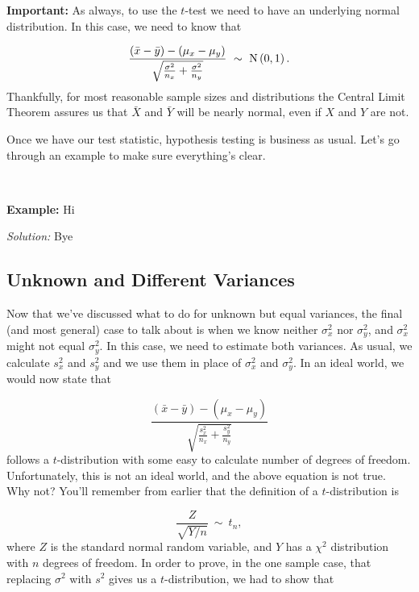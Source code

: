 \textbf{Important:} As always, to use the $t$-test we need to have an underlying normal distribution.  In this case, we need to know that

\begin{equation*}
\frac{\left(\bar{x} - \bar{y}\right) - \left(\mu_x - \mu_y\right)}{\sqrt{\frac{\sigma^2}{n_x} + \frac{\sigma^2}{n_y}}} \ \sim \  {\rm N}\left(0,1\right).
\end{equation*}
Thankfully, for most reasonable sample sizes and distributions the Central Limit Theorem assures us that $\bar{X}$ and $\bar{Y}$ will be nearly normal, even if $X$ and $Y$ are not.

Once we have our test statistic, hypothesis testing is business as usual.  Let's go through an example to make sure everything's clear.

~

\textbf{Example:}  Hi \ex

\emph{Solution:} Bye



\subsection{Unknown and Different Variances}

Now that we've discussed what to do for unknown but equal variances, the final (and most general) case to talk about is when we know neither $\sigma^2_x$ nor $\sigma^2_y$, and $\sigma^2_x$ might not equal $\sigma^2_y$.  In this case, we need to estimate both variances.  As usual, we calculate $s^2_x$ and $s^2_y$ and we use them in place of $\sigma^2_x$ and $\sigma^2_y$.  In an ideal world, we would now state that

\begin{equation*}
\frac{\left(\bar{x} - \bar{y}\right) - \left(\mu_x - \mu_y\right)}{\sqrt{\frac{s^2_x}{n_x} + \frac{s^2_y}{n_y}}}
\end{equation*}
follows a $t$-distribution with some easy to calculate number of degrees of freedom.  Unfortunately, this is not an ideal world, and the above equation is not true.  Why not?  You'll remember from earlier that the definition of a $t$-distribution is

\begin{equation*}
\frac{Z}{\sqrt{Y/n}}\ \sim \  t_n,
\end{equation*}
where $Z$ is the standard normal random variable, and $Y$ has a $\chi^2$ distribution with $n$ degrees of freedom.  In order to prove, in the one sample case, that replacing $\sigma^2$ with $s^2$ gives us a $t$-distribution, we had to show that

